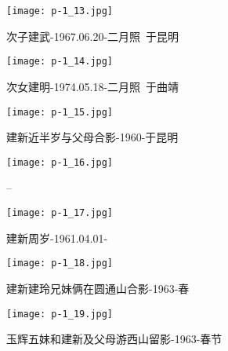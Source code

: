 \begin{figure}
    \begin{center}
        \texttt{[image: p-1\_13.jpg]}
        \caption{次子建武-1967.06.20-二月照~于昆明}
    \end{center}
\end{figure}

\clearpage


\begin{figure}
    \begin{center}
        \texttt{[image: p-1\_14.jpg]}
        \caption{次女建明-1974.05.18-二月照~于曲靖}
    \end{center}
\end{figure}

\clearpage


\begin{figure}
    \begin{center}
        \texttt{[image: p-1\_15.jpg]}
        \caption{建新近半岁与父母合影-1960-于昆明}
    \end{center}
\end{figure}

\clearpage


\begin{figure}
    \begin{center}
        \texttt{[image: p-1\_16.jpg]}
        \caption{--}
    \end{center}
\end{figure}

\clearpage


\begin{figure}
    \begin{center}
        \texttt{[image: p-1\_17.jpg]}
        \caption{建新周岁-1961.04.01-}
    \end{center}
\end{figure}

\clearpage


\begin{figure}
    \begin{center}
        \texttt{[image: p-1\_18.jpg]}
        \caption{建新建玲兄妹俩在圆通山合影-1963-春}
    \end{center}
\end{figure}

\clearpage


\begin{figure}
    \begin{center}
        \texttt{[image: p-1\_19.jpg]}
        \caption{玉辉五妹和建新及父母游西山留影-1963-春节}
    \end{center}
\end{figure}


